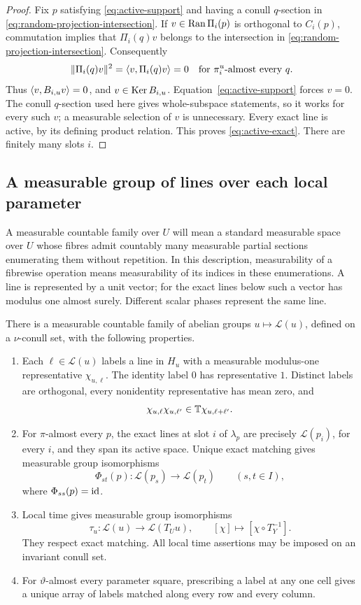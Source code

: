 \begin{proof}
Fix $p$ satisfying \eqref{eq:active-support} and having a conull
$q$-section in \eqref{eq:random-projection-intersection}.
If $v\in\operatorname{Ran}\Pi_i(p)$ is orthogonal to $C_i(p)$, commutation implies
that $\Pi_i(q)v$ belongs to the intersection in
\eqref{eq:random-projection-intersection}. Consequently
\[
 \lVert \Pi_i(q)v\rVert^2=\langle v,\Pi_i(q)v\rangle=0
 \quad\text{for }\pi_i^u\text{-almost every }q.
\]
Thus $\langle v,B_{i,u}v\rangle=0$, and $v\in\operatorname{Ker} B_{i,u}$.
Equation~\eqref{eq:active-support} forces $v=0$.
The conull $q$-section used here gives whole-subspace statements, so it
works for every such $v$; a measurable selection of $v$ is unnecessary.
Every exact line is active, by its defining product relation. This
proves \eqref{eq:active-exact}. There are finitely many slots $i$.
\end{proof}

\subsection{A measurable group of lines over each local parameter}

A measurable countable family over $U$ will mean a standard measurable
space over $U$ whose fibres admit countably many measurable partial
sections enumerating them without repetition. In this description,
measurability of a fibrewise operation means measurability of its
indices in these enumerations. A line is represented by a unit vector;
for the exact lines below such a vector has modulus one almost surely.
Different scalar phases represent the same line.

\begin{proposition}\label{prop:measurable-labels}
There is a measurable countable family of abelian groups
$u\mapsto\mathcal L(u)$, defined on a $\nu$-conull set, with the
following properties.
\begin{enumerate}
\item Each $\ell\in\mathcal L(u)$ labels a line in $H_u$ with a
measurable modulus-one representative $\chi_{u,\ell}$. The identity
label $0$ has representative $1$. Distinct labels are orthogonal,
every nonidentity representative has mean zero, and
\[
 \chi_{u,\ell}\chi_{u,\ell'}
 \in\mathbb T\chi_{u,\ell+\ell'}.
\]
\item For $\pi$-almost every $p$, the exact lines at slot $i$ of
$\lambda_p$ are precisely $\mathcal L(p_i)$, for every $i$, and they
span its active space. Unique exact matching gives measurable group
isomorphisms
\[
 \Phi_{st}(p):\mathcal L(p_s)\longrightarrow\mathcal L(p_t)
 \qquad(s,t\in I),
\]
where $\Phi_{ss}(p)=\operatorname{id}$.
\item Local time gives measurable group isomorphisms
\[
 \tau_u:\mathcal L(u)\longrightarrow\mathcal L(T_Uu),
 \qquad [\chi]\longmapsto[\chi\circ T_Y^{-1}].
\]
They respect exact matching. All local time assertions may be imposed
on an invariant conull set.
\item For $\vartheta$-almost every parameter square, prescribing a
label at any one cell gives a unique array of labels matched along
every row and every column.
\end{enumerate}
\end{proposition}


